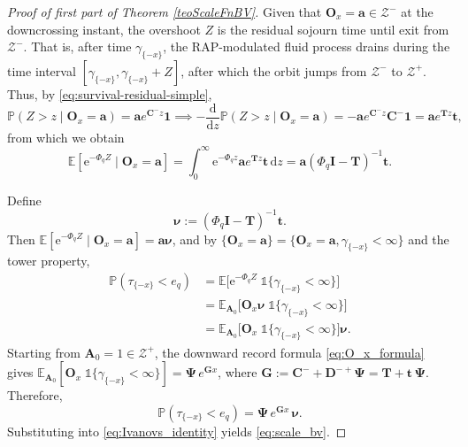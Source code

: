 \documentclass[a4paper,11pt]{article}
\newcommand{\comment}[1]{{\textcolor{red}{#1}}}
\numberwithin{equation}{section}
\theoremstyle{plain}
\theoremstyle{definition}
\newcommand{\1}{\mathbf{1}}
\newcommand{\e}{\mathrm{e}}
\newcommand{\dd}{\mathrm{d}}
\newcommand{\PP}{\mathbb{P}}
\begin{document}
\begin{proof}[Proof of first part of Theorem \ref{teoScaleFnBV}]
Given that $\bm{O}_x = \bm{a} \in \mathcal{Z}^-$ at the downcrossing instant, the overshoot $Z$ is the residual sojourn time until exit from $\mathcal{Z}^-$.
{That is, after time $\gamma_{\{-x\}}$, the RAP-modulated fluid process drains during the time interval $[\gamma_{\{-x\}},\gamma_{\{-x\}}+Z]$, after which the orbit jumps from $\mathcal{Z}^-$ to $\mathcal{Z}^+$.}
Thus, by \eqref{eq:survival-residual-simple},
\[\PP(Z > z \mid \bm{O}_x = \bm{a}) = \bm{a}e^{\bm{C}^- z}\bm{1}\implies -\frac{\dd}{\dd z}\PP(Z > z \mid \bm{O}_x = \bm{a}) = -\bm{a}e^{\bm{C}^- z}\bm{C}^-\bm{1} = \bm{a}e^{\bm{T} z}\bm{t},\] from which we obtain
\begin{equation*}
\mathbb{E}[\e^{-\Phi_q Z} \mid \bm{O}_x = \bm{a}]
= \int_0^\infty \e^{-\Phi_q z} \bm{a}e^{\bm{T} z}\bm{t} \,\dd z
= \bm{a} (\Phi_q \bm{I} - \bm{T})^{-1}\bm{t}.
\end{equation*}

Define
\begin{equation}\label{eq:nu_bv}
\bm{\nu} := (\Phi_q \bm I - \bm{T})^{-1}\bm{t}.
\end{equation}
Then $\mathbb{E}[\e^{-\Phi_q Z} \mid \bm{O}_x = \bm{a}] = \bm{a}\bm{\nu}$, and by $\{\bm{O}_x = \bm{a}\}=\{\bm{O}_x = \bm{a}, \gamma_{\{-x\}} < \infty\}$ and the tower property,
\begin{equation}\label{eqnBoundedVariationTauxProb}
\begin{split}
\PP(\tau_{\{-x\}} < e_q) 
&= \mathbb{E}\Big[\e^{-\Phi_q Z}\;\mathds{1}\{\gamma_{\{-x\}} < \infty\}\Big]\\
&= \mathbb{E}_{\bm A_0}\Big[\bm{O}_x \bm{\nu}\;\mathds{1}\{\gamma_{\{-x\}} < \infty\}\Big]\\
&= \mathbb{E}_{\bm A_0}\Big[\bm{O}_x\;\mathds{1}\{\gamma_{\{-x\}} < \infty\}\Big]\bm{\nu}.
\end{split}
\end{equation}Starting from $\bm{A}_0 = 1 \in \mathcal{Z}^+$, the downward record formula \eqref{eq:O_x_formula} gives $\mathbb{E}_{\bm A_0}[\bm{O}_x\;\mathds{1}\{\gamma_{\{-x\}} < \infty\}] = \bm{\Psi}\, e^{\bm{G}x}$, where $\bm{G} := \bm{C}^- + \bm{D}^{-+}\bm{\Psi}= \bm{T} + \bm{t}\,\bm{\Psi}$. Therefore,
\begin{equation}\label{eq:hitting_bv_final}
\PP(\tau_{\{-x\}} < e_q) = \bm{\Psi}\, e^{\bm{G}x}\,\bm{\nu}.
\end{equation}
Substituting into  \eqref{eq:Ivanovs_identity} yields \eqref{eq:scale_bv}. 
\end{proof}
\end{document}
